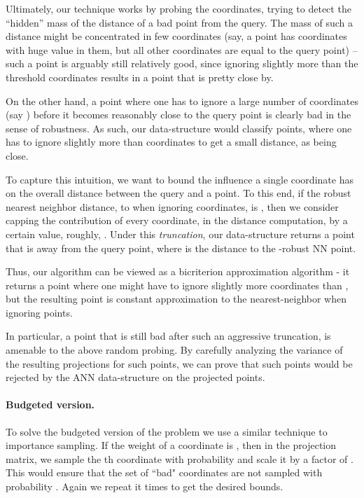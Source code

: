 \documentclass[12pt]{article}\usepackage[cm]{fullpage}
\newcommand{\Term}[1]{\textsf{#1}}
\theoremstyle{remark}\theoremheaderfont{\sf}\theorembodyfont{\upshape}\newtheorem{defn}[theorem]{Definition}
\numberwithin{figure}{section}\numberwithin{table}{section}\numberwithin{equation}{section}
\renewcommand{\th}{th\xspace}
\newcommand{\ANN}{\Term{ANN}\xspace}\newcommand{\NN}{\Term{NN}\xspace}
\begin{document}
Ultimately, our technique works by probing the coordinates, trying to
detect the ``hidden'' mass of the distance of a bad point from the
query. The mass of such a distance might be concentrated in few
coordinates (say, a point has  coordinates with huge value in
them, but all other coordinates are equal to the query point) -- such
a point is arguably still relatively good, since ignoring slightly
more than the threshold  coordinates results in a point that is
pretty close by.

On the other hand, a point where one has to ignore a large number of
coordinates (say ) before it becomes reasonably close to the query
point is clearly bad in the sense of robustness. As such, our
data-structure would classify points, where one has to ignore slightly
more than  coordinates to get a small distance, as being close.

To capture this intuition, we want to bound the influence a single
coordinate has on the overall distance between the query and a
point. To this end, if the robust nearest neighbor distance, to
 when ignoring  coordinates, is , then we consider
capping the contribution of every coordinate, in the distance
computation, by a certain value, roughly, . Under this
\emph{truncation}, our data-structure returns a point that is 
away from the query point, where  is the distance to the
-robust \NN point.

Thus, our algorithm can be viewed as a bicriterion approximation
algorithm - it returns a point where one might have to ignore slightly
more coordinates than , but the resulting point is constant
approximation to the nearest-neighbor when ignoring  points.

In particular, a point that is still bad after such an aggressive
truncation, is amenable to the above random probing. By carefully
analyzing the variance of the resulting projections for such points,
we can prove that such points would be rejected by the \ANN
data-structure on the projected points.


\paragraph{Budgeted version.}

To solve the budgeted version of the problem we use a similar
technique to importance sampling. If the weight of a coordinate is
, then in the projection matrix, we sample the \th coordinate
with probability  and scale it by a factor of
. This would ensure that the set of ``bad" coordinates
are not sampled with probability . Again we repeat it
 times to get the desired bounds.
\end{document}

